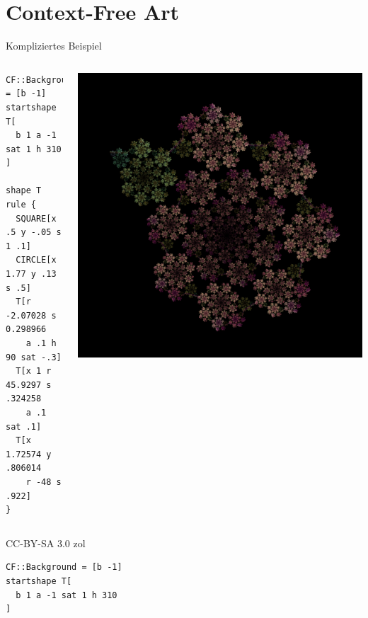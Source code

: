 \documentclass{beamer}
\theoremstyle{example}
\begin{document}
\section{Context-Free Art}
\begin{frame}[fragile]{Kompliziertes Beispiel}
\begin{columns}
\column{4cm}
\footnotesize{
\begin{lstlisting}
CF::Background = [b -1]
startshape T[
  b 1 a -1 sat 1 h 310
]

shape T
rule {
  SQUARE[x .5 y -.05 s 1 .1]
  CIRCLE[x 1.77 y .13 s .5]
  T[r -2.07028 s 0.298966
    a .1 h 90 sat -.3]
  T[x 1 r 45.9297 s .324258
    a .1 sat .1]
  T[x 1.72574 y .806014
    r -48 s .922]
} 
\end{lstlisting}
}
\column{6cm}
\hfill\includegraphics[width=\linewidth]{./images/beispiel.png}
\end{columns}
\tiny
\hfill CC-BY-SA 3.0 zol
\end{frame}

\newsavebox\mybox

\begin{lrbox}{\mybox}
\begin{lstlisting}[name=beispiel]
CF::Background = [b -1]
startshape T[
  b 1 a -1 sat 1 h 310
]
\end{lstlisting}
\end{lrbox}
\end{document}

